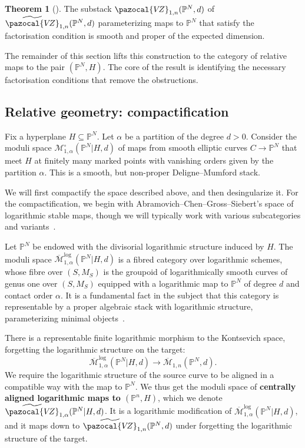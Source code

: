 \documentclass[11pt]{amsart}
\newcommand{\PP}{\mathbb P}
\newcommand{\VZ}{\pazocal{V\!Z}}
\renewcommand{\to}{\rightarrow}
\theoremstyle{definition}
\newtheorem{thm}{Theorem}[section]
\theoremstyle{definition}
\begin{document}
\begin{thm}[{\cite[Theorem B]{RSPW}}]
The substack $\VZ_{1,n}(\mathbb P^N,d)$ of $\widetilde\VZ_{1,n}(\PP^N,d)$ parameterizing maps to $\mathbb P^N$ that satisfy the factorisation condition is smooth and proper of the expected dimension.
\end{thm}

The remainder of this section lifts this construction to the category of relative maps to the pair $(\mathbb P^N,H)$. The core of the result is identifying the necessary factorisation conditions that remove the obstructions. 

\subsection{Relative geometry: compactification} Fix a hyperplane $H\subseteq \mathbb P^N$. Let $\alpha$ be a partition of the degree $d>0$. Consider the moduli space $\mathcal M_{1,\alpha}^\circ(\mathbb P^N|H,d)$ of maps from smooth elliptic curves $C\to \mathbb P^N$ that meet $H$ at finitely many marked points with vanishing orders given by the partition $\alpha$. This is a smooth, but non-proper Deligne--Mumford stack. 

We will first compactify the space described above, and then desingularize it. For the compactification, we begin with Abramovich--Chen--Gross--Siebert's space of logarithmic stable maps, though we will typically work with various subcategories and variants~\cite{AbramovichChenLog,ChenLog,GrossSiebertLog,KimLog}.

Let $\PP^N$ be endowed with the divisorial logarithmic structure induced by $H$. The moduli space $\overline{\mathcal{M}}^{\operatorname{log}}_{1,\alpha}(\mathbb P^N|H,d)$ is a fibred category over logarithmic schemes, whose fibre over $(S,M_S)$ is the groupoid of logarithmically smooth curves of genus one over $(S,M_S)$ equipped with a logarithmic map to $\mathbb P^N$ of degree $d$ and contact order $\alpha$. It is a fundamental fact in the subject that this category is representable by a proper algebraic stack with logarithmic structure, parameterizing minimal objects~\cite{ChenLog}. 

There is a representable finite logarithmic morphism to the Kontsevich space, forgetting the logarithmic structure on the target:
$$
\overline{\mathcal M}^{\mathrm{log}}_{1,\alpha}(\mathbb P^N|H,d) \to \overline{\mathcal M}_{1,n}(\mathbb P^N,d).
$$
We require the logarithmic structure of the source curve to be aligned in a compatible way with the map to $\PP^N$. We thus get the moduli space of \textbf{centrally aligned logarithmic maps to $(\mathbb P^n,H)$}, which we denote $\widetilde{\VZ}_{1,\alpha}(\mathbb P^N|H,d)$. It is a logarithmic modification of $\overline{\mathcal M}^{\mathrm{log}}_{1,\alpha}(\mathbb P^N|H,d)$, and it maps down to $\widetilde\VZ_{1,n}(\PP^N,d)$ under forgetting the logarithmic structure of the target.
\end{document}
